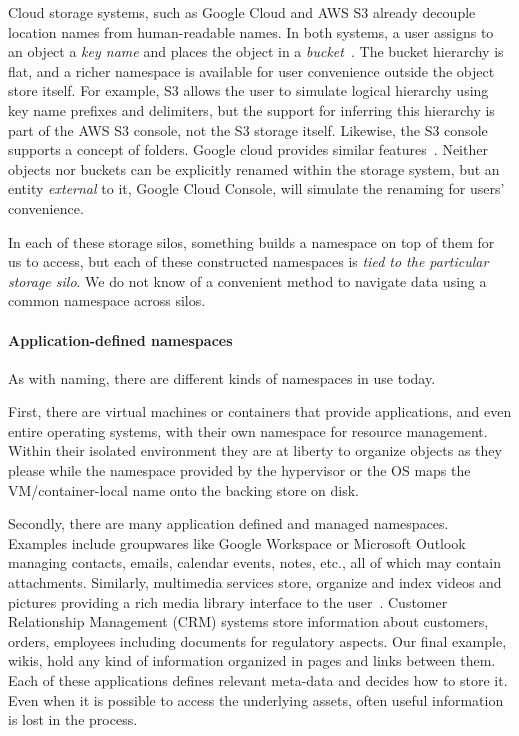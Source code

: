 Cloud storage systems, such as Google Cloud and AWS S3 already decouple location names from human-readable names.
In both systems, a user assigns to an object a \textit{key name} and places the object in a \textit{bucket}~\cite{google-cloud-storage,aws-s3}.
The bucket hierarchy is flat, and a richer namespace is available for user convenience outside the object store itself.
For example, S3 allows the user to simulate logical hierarchy using key name prefixes and delimiters, but the support
for inferring this hierarchy is part of the AWS S3 console, not the S3 storage itself.
Likewise, the S3 console supports a concept of folders.
Google cloud provides similar features~\cite{google-cloud-naming}. Neither objects nor buckets can be explicitly renamed within the storage system,
but an entity \textit{external} to it, Google Cloud Console, will simulate the renaming for users' convenience.

In each of these storage silos, something builds a namespace on top of them for us to access, but each of these constructed namespaces is \textit{tied to the particular storage silo}.
We do not know of a convenient method to navigate data using a common namespace across silos.

\paragraph{Application-defined namespaces}
As with naming, there are different kinds of namespaces in use today.

First, there are virtual machines or containers that provide applications, and even entire operating systems, with their own namespace for resource management.
Within their isolated environment they are at liberty to organize objects as they please while the namespace provided by the hypervisor or the OS maps the VM/container-local name onto the backing store on disk.

Secondly, there are many application defined and managed namespaces.
Examples include groupwares like Google Workspace or Microsoft Outlook managing contacts, emails, calendar events, notes, etc., all of which may contain attachments.
Similarly, multimedia services store, organize and index videos and pictures providing a rich media library interface to the user~\cite{orr2020sample}.
Customer Relationship Management (CRM) systems store information about customers, orders, employees including documents for regulatory aspects.
Our final example, wikis, hold any kind of information organized in pages and links between them.
Each of these applications defines relevant meta-data and decides how to store it.
Even when it is possible to access the underlying assets, often useful information is lost in the process.

